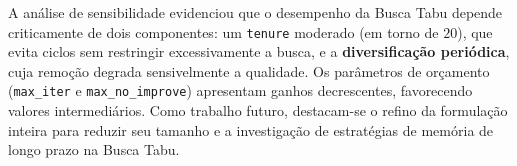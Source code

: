 \documentclass[a4paper,11pt]{article}
\begin{document}
A análise de sensibilidade evidenciou que o desempenho da Busca Tabu depende criticamente
de dois componentes: um \texttt{tenure} moderado (em torno de $20$), que evita ciclos sem
restringir excessivamente a busca, e a \textbf{diversificação periódica}, cuja remoção
degrada sensivelmente a qualidade. Os parâmetros de orçamento (\texttt{max\_iter} e
\texttt{max\_no\_improve}) apresentam ganhos decrescentes, favorecendo valores
intermediários. Como trabalho futuro, destacam-se o refino da formulação inteira para
reduzir seu tamanho e a investigação de estratégias de memória de longo prazo na Busca
Tabu.



\end{document}
